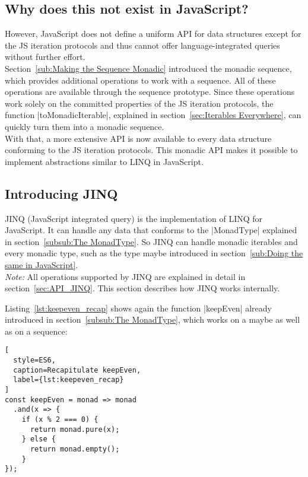 \subsection{Why does this not exist in JavaScript?} %
\label{sub:Why does this not exist in JavaScript?}
However, JavaScript does not define a uniform API for data structures except
for the JS iteration protocols and thus cannot offer language-integrated queries
without further effort. \\
Section~\ref{sub:Making the Sequence Monadic} introduced the monadic sequence,
which provides additional operations to work with a sequence. All of these
operations are available through the sequence prototype. Since these
operations work solely on the committed properties of the JS iteration
protocols, the function |toMonadicIterable|, explained in
section~\ref{sec:Iterables Everywhere}, can quickly turn them into a monadic
sequence.\\
With that, a more extensive API is now available to every data structure
conforming to the JS iteration protocols. This monadic API makes it possible to
implement abstractions similar to LINQ in JavaScript.

\subsection{Introducing JINQ} %
\label{sub:Introducing JINQ}
JINQ (JavaScript integrated query) is the implementation of LINQ for
JavaScript. It can handle any data that conforms to the |MonadType| explained
in section~\ref{subsub:The MonadType}. So JINQ can handle monadic iterables and
every monadic type, such as the type maybe introduced in
section~\ref{sub:Doing the same in JavaScript}.\\
\textit{Note:} All operations supported by JINQ are explained in detail in 
section~\ref{sec:API_JINQ}. This section describes how JINQ works
internally.

Listing~\ref{lst:keepeven_recap} shows again the function |keepEven| already
introduced in section~\ref{subsub:The MonadType}, which works on a maybe as
well as on a sequence:
\begin{lstlisting}[
  style=ES6,
  caption=Recapitulate keepEven,
  label={lst:keepeven_recap}
]
const keepEven = monad => monad
  .and(x => {
    if (x % 2 === 0) {
      return monad.pure(x);
    } else {
      return monad.empty();
    }
}); 
\end{lstlisting}

